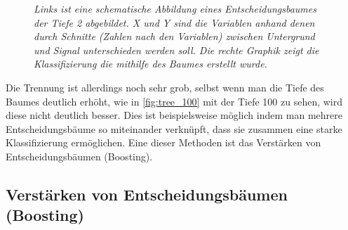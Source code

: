 \begin{figure}[hhh]
\centering     %
{}
\caption{\it Links ist eine schematische Abbildung eines Entscheidungsbaumes der Tiefe 2 abgebildet. X und Y sind die Variablen anhand denen durch Schnitte (Zahlen nach den Variablen) zwischen Untergrund und Signal unterschieden werden soll. Die rechte Graphik zeigt die Klassifizierung die mithilfe des Baumes erstellt wurde.}
\end{figure}


Die Trennung ist allerdings noch sehr grob, selbst wenn man die Tiefe des Baumes deutlich erh\"oht, wie in \ref{fig:tree_100} mit der Tiefe 100 zu sehen, wird diese nicht deutlich besser. Dies ist beispielsweise m\"oglich indem man mehrere Entscheidungsb\"aume so miteinander verkn\"upft, dass sie zusammen eine starke Klassifizierung erm\"oglichen. Eine dieser Methoden ist das Verst\"arken von Entscheidungsb\"aumen (Boosting).





\subsection{Verst\"arken von Entscheidungsb\"aumen (Boosting)}
\label{ch:Algorithmen:subsec:Boosting}


